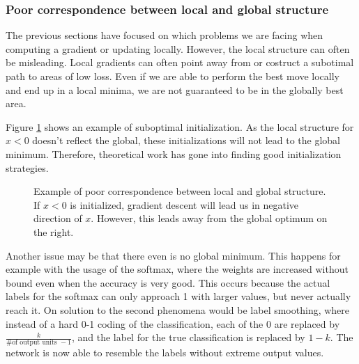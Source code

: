 \subsubsection{Poor correspondence between local and global
structure}\label{prob:5}

The previous sections have focused on which problems we are facing when
computing a gradient or updating locally. However, the local structure can often
be misleading. Local gradients can often point away from  or costruct a
subotimal path to areas of low loss. Even if we are able to perform the best
move locally and end up in a local minima, we are not guaranteed to be in the
globally best area. 

Figure \ref{fig:Poor_correspondence} shows an example of suboptimal
initialization. As the local structure for $x<0$ doesn't reflect the global,
these initializations will not lead to the global minimum. Therefore,
theoretical work has gone into finding good initialization strategies.

\begin{figure}[h]
    \begin{center}
        \caption{Example of poor correspondence between local and global
        structure. If $x<0$ is initialized, gradient descent will lead us in
        negative direction of $x$. However, this leads away from the global optimum
        on the right.}
        \label{fig:Poor_correspondence}
    \end{center}
\end{figure}

Another issue may be that there even is no global minimum. This happens for
example with the usage of the softmax, where the weights are increased without
bound even when the accuracy is very good. This occurs because the actual labels
for the softmax can only approach 1 with larger values, but never actually reach
it.  On solution to the second phenomena would be label smoothing, where instead
of a hard 0-1 coding of the classification, each of the 0 are replaced by
$\frac{k}{\textrm{\# of output units }-1}$, and the label for the true
classification is replaced by $1-k$. The network is now able to
resemble the labels without extreme output values.


